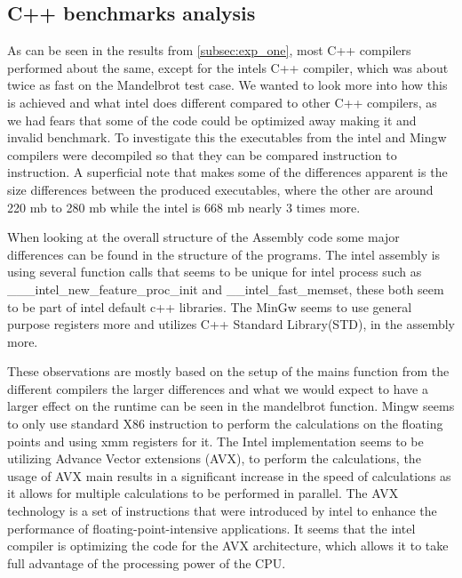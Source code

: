 \subsection{C++ benchmarks analysis}
As can be seen in the results from \cref{subsec:exp_one}, most C++ compilers performed about the same, except for the intels C++ compiler, which was about twice as fast on the Mandelbrot test case. We wanted to look more into how this is achieved and what intel does different compared to other C++ compilers, as we had fears that some of the code could be optimized away making it and invalid benchmark. To investigate this the executables from the intel and Mingw compilers were decompiled so that they can be compared instruction to instruction. A superficial note that makes some of the differences apparent is the size differences between the produced executables, where the other are around 220 mb to 280 mb while the intel is 668 mb nearly 3 times more.

When looking at the overall structure of the Assembly code some major differences can be found in the structure of the programs. The intel assembly is using several function calls that seems to be unique for intel process such as ___intel_new_feature_proc_init and __intel_fast_memset, these both seem to be part of intel default c++ libraries\cite{Intelassembly}. The MinGw seems to use general purpose registers more and utilizes C++ Standard Library(STD), in the assembly more.



These observations are mostly based on the setup of the mains function from the different compilers the larger differences and what we would expect to have a larger effect on the runtime can be seen in the mandelbrot function. Mingw seems to only use standard X86 instruction\cite{X86} to perform the calculations on the floating points and using xmm registers for it. The Intel implementation seems to be utilizing Advance Vector extensions (AVX)\cite{AVX}, to perform the calculations, the usage of AVX main results in a significant increase in the speed of calculations as it allows for multiple calculations to be performed in parallel. The AVX technology is a set of instructions that were introduced by intel to enhance the performance of floating-point-intensive applications\cite{AVX}. It seems that the intel compiler is optimizing the code for the AVX architecture, which allows it to take full advantage of the processing power of the CPU. 

